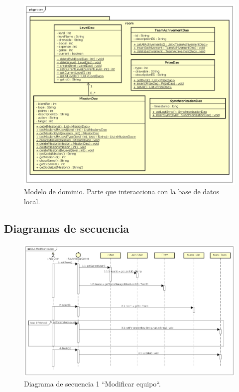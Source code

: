 \documentclass[twoside]{report}
\begin{document}
\begin{figure}[H]
\begin{center}
\includegraphics[scale=0.55]{images/clasesRoom.png}
\caption{Modelo de dominio. Parte que interacciona con la base de datos local.}
\end{center}
\end{figure}


\subsection{Diagramas de secuencia}

\begin{figure}[H]
\begin{center}
\includegraphics[width=\textwidth]{images/sequence/CU1}
\caption{Diagrama de secuencia 1 “Modificar equipo“.}
\end{center}
\end{figure}
\end{document}

